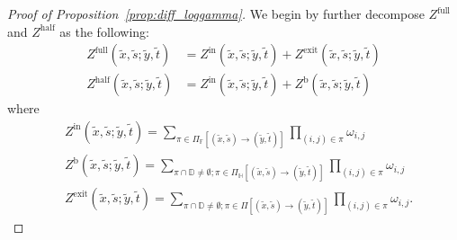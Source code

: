 \documentclass[11pt]{article}
\theoremstyle{definition}
\newcommand{\HH}{\mathbb{H}}
\newcommand{\F}{\mathbb{F}}
\newcommand{\D}{\mathbb{D}}
\newcommand{\Zfull}{Z^{\mathrm{full}}}
\newcommand{\Zhalf}{Z^{\mathrm{half}}}
\newcommand{\Zin}{Z^{\mathrm{in}}}
\newcommand{\Zexit}{Z^{\mathrm{exit}}}
\newcommand{\Zb}{Z^{\mathrm{b}}}
\begin{document}
\begin{proof}[Proof of Proposition~\ref{prop:diff_loggamma}]
We begin by further decompose $\Zfull$ and $\Zhalf$ as the following:
\begin{equation}
    \begin{aligned}
        \Zfull(\tilde{x}, \tilde{s};\tilde{y}, \tilde{t}) &= \Zin(\tilde{x}, \tilde{s};\tilde{y}, \tilde{t}) + \Zexit(\tilde{x}, \tilde{s};\tilde{y}, \tilde{t})\\
        \Zhalf(\tilde{x}, \tilde{s};\tilde{y}, \tilde{t}) &= \Zin(\tilde{x}, \tilde{s};\tilde{y}, \tilde{t}) + \Zb(\tilde{x}, \tilde{s};\tilde{y}, \tilde{t})      
    \end{aligned}
\end{equation}
where 
\begin{equation}
        \begin{aligned}
        &\Zin(\tilde{x}, \tilde{s};\tilde{y}, \tilde{t}) = \sum_{\pi \in \Pi_{\F}[(\tilde{x},\tilde{s})\to(\tilde{y},\tilde{t})]} 
\prod_{(i,j)\in\pi} \omega_{i,j}\\
&\Zb(\tilde{x}, \tilde{s};\tilde{y}, \tilde{t}) =\sum_{\pi \cap \D \neq \emptyset; \pi \in \Pi_{\HH}[(\tilde{x},\tilde{s})\to(\tilde{y},\tilde{t})]}  
\prod_{(i,j)\in\pi} \omega_{i,j}\\
&\Zexit(\tilde{x}, \tilde{s};\tilde{y}, \tilde{t}) =\sum_{\pi \cap \D \neq \emptyset; \pi \in \Pi[(\tilde{x},\tilde{s})\to(\tilde{y},\tilde{t})]}  
\prod_{(i,j)\in\pi} \omega_{i,j}.
    \end{aligned}
\end{equation}


\end{proof}
\end{document}
